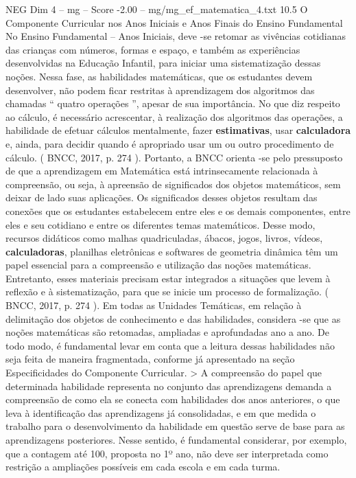 \begin{textsample}{NEG Dim 4 – mg – Score -2.00 – mg/mg\_ef\_matematica\_4.txt}  \label{ex:f4_neg_096}
10.5 O Componente Curricular nos Anos Iniciais e Anos Finais do Ensino Fundamental No Ensino Fundamental – Anos Iniciais, deve -se retomar as vivências cotidianas das crianças com números, formas e espaço, e também as experiências desenvolvidas na Educação Infantil, para iniciar uma sistematização dessas noções.
Nessa fase, as habilidades matemáticas, que os estudantes devem desenvolver, não podem ficar restritas à aprendizagem dos algoritmos das chamadas “ quatro operações ”, apesar de sua importância.
No que diz respeito ao cálculo, é necessário acrescentar, à realização dos algoritmos das operações, a habilidade de efetuar cálculos mentalmente, fazer \textbf{estimativas}, usar \textbf{calculadora} e, ainda, para decidir quando é apropriado usar um ou outro procedimento de cálculo. ( BNCC, 2017, p. 274 ).
Portanto, a BNCC orienta -se pelo pressuposto de que a aprendizagem em Matemática está intrinsecamente relacionada à compreensão, ou seja, à apreensão de significados dos objetos matemáticos, sem deixar de lado suas aplicações.
Os significados desses objetos resultam das conexões que os estudantes estabelecem entre eles e os demais componentes, entre eles e seu cotidiano e entre os diferentes temas matemáticos.
Desse modo, recursos didáticos como malhas quadriculadas, ábacos, jogos, livros, vídeos, \textbf{calculadoras}, planilhas eletrônicas e softwares de geometria dinâmica têm um papel essencial para a compreensão e utilização das noções matemáticas.
Entretanto, esses materiais precisam estar integrados a situações que levem à reflexão e à sistematização, para que se inicie um processo de formalização. ( BNCC, 2017, p. 274 ).
Em todas as Unidades Temáticas, em relação à delimitação dos objetos de conhecimento e das habilidades, considera -se que as noções matemáticas são retomadas, ampliadas e aprofundadas ano a ano.
De todo modo, é fundamental levar em conta que a leitura dessas habilidades não seja feita de maneira fragmentada, conforme já apresentado na seção Especificidades do Componente Curricular. > A compreensão do papel que determinada habilidade representa no conjunto das aprendizagens demanda a compreensão de como ela se conecta com habilidades dos anos anteriores, o que leva à identificação das aprendizagens já consolidadas, e em que medida o trabalho para o desenvolvimento da habilidade em questão serve de base para as aprendizagens posteriores.
Nesse sentido, é fundamental considerar, por exemplo, que a contagem até 100, proposta no 1º ano, não deve ser interpretada como restrição a ampliações possíveis em cada escola e em cada turma.

\end{textsample}
